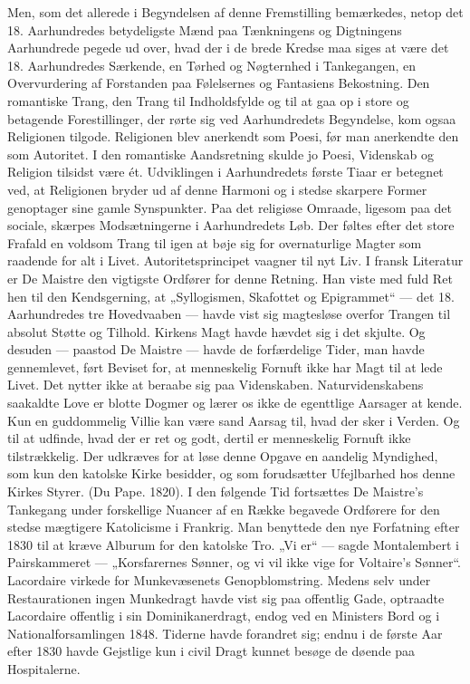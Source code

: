 \documentclass[12pt,a4paper,openany]{book}
\newcommand{\opage}[1]{\marginnote{\footnotesize\textit{[#1]}}}
\begin{document}
Men, som det allerede i Begyndelsen af denne Fremstilling bemærkedes,
netop det 18. Aarhundredes betydeligste Mænd paa Tænkningens
og Digtningens Aarhundrede pegede ud over, hvad der i de
brede Kredse maa siges at være det 18. Aarhundredes Særkende, en
Tørhed og Nøgternhed i Tankegangen, en Overvurdering af Forstanden
paa Følelsernes og Fantasiens Bekostning. Den romantiske Trang,
den Trang til Indholdsfylde og til at gaa op i store og betagende
Forestillinger, der rørte sig ved Aarhundredets Begyndelse, kom ogsaa
Religionen tilgode. Religionen blev anerkendt som Poesi, før man
anerkendte den som Autoritet. I den romantiske Aandsretning skulde
jo Poesi, Videnskab og Religion tilsidst være ét. Udviklingen i Aarhundredets
første Tiaar er betegnet ved, at Religionen bryder ud af
denne Harmoni og i stedse skarpere Former genoptager sine gamle
Synspunkter. Paa det religiøse Omraade, ligesom paa det sociale,
skærpes Modsætningerne i Aarhundredets Løb. Der føltes efter det
store Frafald en voldsom Trang til igen at bøje sig for overnaturlige
Magter som raadende for alt i Livet. Autoritetsprincipet vaagner til
nyt Liv.
I fransk Literatur er De Maistre den vigtigste Ordfører for denne
\opage{115}Retning. Han viste med fuld Ret hen til den Kendsgerning, at
„Syllogismen, Skafottet og Epigrammet“ --- det 18. Aarhundredes
tre Hovedvaaben --- havde vist sig magtesløse overfor Trangen til
absolut Støtte og Tilhold. Kirkens Magt havde hævdet sig i det
skjulte. Og desuden --- paastod De Maistre --- havde de forfærdelige
Tider, man havde gennemlevet, ført Beviset for, at menneskelig Fornuft
ikke har Magt til at lede Livet. Det nytter ikke at beraabe sig
paa Videnskaben. Naturvidenskabens saakaldte Love er blotte Dogmer
og lærer os ikke de egenttlige Aarsager at kende. Kun en guddommelig
Villie kan være sand Aarsag til, hvad der sker i Verden.
Og til at udfinde, hvad der er ret og godt, dertil er menneskelig Fornuft
ikke tilstrækkelig. Der udkræves for at løse denne Opgave en
aandelig Myndighed, som kun den katolske Kirke besidder, og som
forudsætter Ufejlbarhed hos denne Kirkes Styrer. (Du Pape. 1820).
I den følgende Tid fortsættes De Maistre’s Tankegang under forskellige
Nuancer af en Række begavede Ordførere for den stedse mægtigere
Katolicisme i Frankrig. Man benyttede den nye Forfatning efter
1830 til at kræve Alburum for den katolske Tro. „Vi er“ --- sagde
Montalembert i Pairskammeret --- „Korsfarernes Sønner, og vi vil
ikke vige for Voltaire’s Sønner“. Lacordaire virkede for Munkevæsenets
Genopblomstring. Medens selv under Restaurationen ingen
Munkedragt havde vist sig paa offentlig Gade, optraadte Lacordaire
offentlig i sin Dominikanerdragt, endog ved en Ministers Bord og i
Nationalforsamlingen 1848. Tiderne havde forandret sig; endnu i de
første Aar efter 1830 havde Gejstlige kun i civil Dragt kunnet besøge
de døende paa Hospitalerne.
\end{document}
